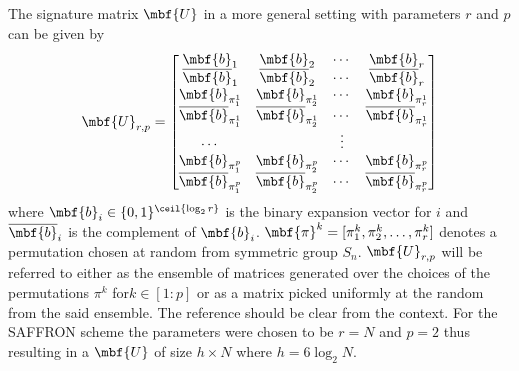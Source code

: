 \documentclass[conference,twocolumn]{IEEEtran}
\begin{document}
 
 The signature matrix 	$\mbf{U}$ in a more general setting with parameters $r$ and $p$ can be given by
 \begin{align}
\label{Eqn:SignatureMatrix}
\mbf{U}_{r,p}=\begin{bmatrix}
\mbf{b}_1  & \mbf{b}_2 &\cdots & \mbf{b}_r \\
\overline{\mbf{b}}_1 & \overline{\mbf{b}}_2 & \cdots & \overline{\mbf{b}}_r\\
\mbf{b}_{\pi^{1}_{1}} & \mbf{b}_{\pi^{1}_{2}} & \cdots & \mbf{b}_{\pi^{1}_{r}}\\
\overline{\mbf{b}}_{\pi^{1}_{1}} & \overline{\mbf{b}}_{\pi^{1}_{2}} & \cdots & \overline{\mbf{b}}_{\pi^{1}_{r}}\\
\cdots &  &\vdots \\
\mbf{b}_{\pi^{p}_{1}} & \mbf{b}_{\pi^{p}_{2}} & \cdots & \mbf{b}_{\pi^{p}_{r}}\\
\overline{\mbf{b}}_{\pi^{p}_{1}} & \overline{\mbf{b}}_{\pi^{p}_{2}} & \cdots & \overline{\mbf{b}}_{\pi^{p}_{r}}
\end{bmatrix}
\end{align}  
where $\mbf{b}_{i}\in\{0,1\}^{\ceil{\log_{2}r}}$ is the binary expansion vector for $i$ and $\overline{\mbf{b}}_{i}$ is the complement of $\mbf{b}_{i}$. $\mbf{\pi}^{k}=[\pi^{k}_1,\pi^{k}_2,\ldots,\pi^{k}_r]$ denotes a permutation chosen at random from symmetric group $S_{n}$.  $\mbf{U}_{r,p}$ will be referred to either as the ensemble of matrices generated over the choices of the permutations $\pi^{k}$ for$k\in[1:p]$ or as a matrix picked uniformly at the random from the said ensemble. The reference should be clear from the context. For the SAFFRON scheme the parameters were chosen to be $r=N$ and $p=2$ thus resulting in a $\mbf{U}$ of size $h \times N$ where $h=6\log_{2}N$. 

\end{document}
